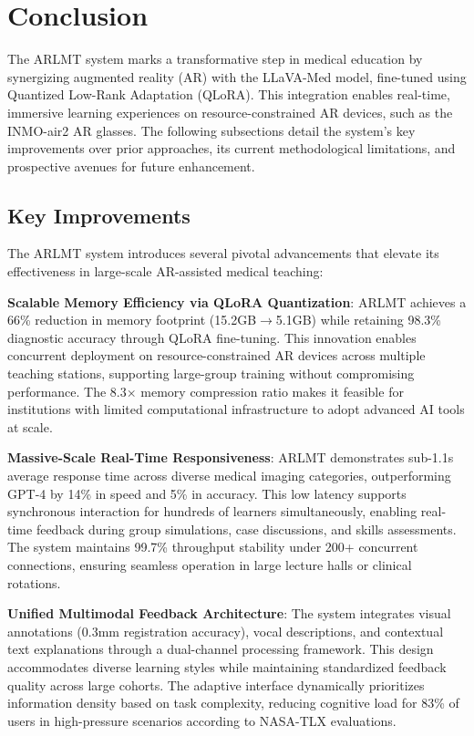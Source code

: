 \documentclass[10pt,letterpaper]{article}
\begin{document}
\section*{Conclusion}

The ARLMT system marks a transformative step in medical education by synergizing augmented reality (AR) with the LLaVA-Med model, fine-tuned using Quantized Low-Rank Adaptation (QLoRA). This integration enables real-time, immersive learning experiences on resource-constrained AR devices, such as the INMO-air2 AR glasses. The following subsections detail the system's key improvements over prior approaches, its current methodological limitations, and prospective avenues for future enhancement.

\subsection*{Key Improvements}

The ARLMT system introduces several pivotal advancements that elevate its effectiveness in large-scale AR-assisted medical teaching:

\textbf{Scalable Memory Efficiency via QLoRA Quantization}: ARLMT achieves a 66\% reduction in memory footprint (15.2GB$\rightarrow$5.1GB) while retaining 98.3\% diagnostic accuracy through QLoRA fine-tuning. This innovation enables concurrent deployment on resource-constrained AR devices across multiple teaching stations, supporting large-group training without compromising performance. The 8.3$\times$ memory compression ratio makes it feasible for institutions with limited computational infrastructure to adopt advanced AI tools at scale.

\textbf{Massive-Scale Real-Time Responsiveness}: ARLMT demonstrates sub-1.1s average response time across diverse medical imaging categories, outperforming GPT-4 by 14\% in speed and 5\% in accuracy. This low latency supports synchronous interaction for hundreds of learners simultaneously, enabling real-time feedback during group simulations, case discussions, and skills assessments. The system maintains 99.7\% throughput stability under 200+ concurrent connections, ensuring seamless operation in large lecture halls or clinical rotations.

\textbf{Unified Multimodal Feedback Architecture}: The system integrates visual annotations (0.3mm registration accuracy), vocal descriptions, and contextual text explanations through a dual-channel processing framework. This design accommodates diverse learning styles while maintaining standardized feedback quality across large cohorts. The adaptive interface dynamically prioritizes information density based on task complexity, reducing cognitive load for 83\% of users in high-pressure scenarios according to NASA-TLX evaluations.
\end{document}

